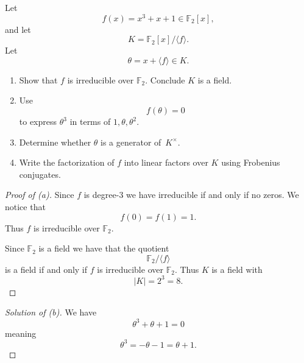 \begin{prob}
    Let 
    \[
        f(x) = x^3 + x + 1 \in \mathbb F_2[x],
    \]
    and let 
    \[
        K = \mathbb F_2[x]/\langle f \rangle.
    \]
    Let 
    \[
        \theta = x + \langle f \rangle \in K.
    \]
    \begin{enumerate}[label=\alph*)]
        \item Show that $f$ is irreducible over 
            $\mathbb F_2$. Conclude $K$ is a field.
        \item Use 
            \[
                f(\theta) = 0
            \]
            to express $\theta^3$
            in terms of $1,\theta, \theta^2$.
        \item Determine whether $\theta$ is a generator 
            of $K^\times$. 
        \item Write the factorization of $f$ into linear 
            factors over $K$ using Frobenius conjugates.
    \end{enumerate}
\end{prob}
\begin{proof}[Proof of (a)]
    Since $f$ is degree-$3$ we have irreducible if and only 
    if no zeros. We notice that 
    \[
        f(0) = f(1) = 1.
    \]
    Thus $f$ is irreducible over $\mathbb F_2$.

    Since $\mathbb F_2$ is a field we have that the quotient 
    \[
        \mathbb F_2/\langle f \rangle
    \]
    is a field if and only if $f$ is irreducible over 
    $\mathbb F_2$. Thus $K$ is a field with 
    \[
        |K| = 2^3 = 8.
    \]  
\end{proof}
\begin{proof}[Solution of (b)]
    We have 
    \[
        \theta^3 + \theta + 1 = 0
    \]
    meaning 
    \[
        \theta^3 = -\theta - 1 = \theta + 1.
    \]
\end{proof}
